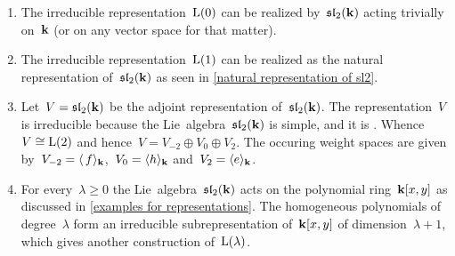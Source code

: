 %       
%       
%       
%       
%       


\begin{examples}
  \leavevmode
  \begin{enumerate}
    \item
      The irreducible representation~$\operatorname{L}(0)$ can be realized by~$\mathfrak{sl}_2(\mathbf{k})$ acting trivially on~$\mathbf{k}$ (or on any {\onedimensional} vector space for that matter).
    \item
      The irreducible representation~$\operatorname{L}(1)$ can be realized as the natural representation of~$\mathfrak{sl}_2(\mathbf{k})$ as seen in \cref{natural representation of sl2}.
    \item
      Let~$V = \mathfrak{sl}_2(\mathbf{k})$ be the adjoint representation of~$\mathfrak{sl}_2(\mathbf{k})$.
      The representation~$V$ is irreducible because the Lie~algebra~$\mathfrak{sl}_2(\mathbf{k})$ is simple, and it is {\threedimensional}.
      Whence~$V \cong \operatorname{L}(2)$ and hence~$V = V_{-2} \oplus V_0 \oplus V_2$.
      The occuring weight spaces are given by~$V_{-2} = \langle\, f\rangle_{\mathbf{k}}$,~$V_0 = \langle h\rangle_{\mathbf{k}}$ and~$V_2 = \langle e\rangle_{\mathbf{k}}$.
    \item
      For every~$\lambda \geq 0$ the Lie~algebra~$\mathfrak{sl}_2(\mathbf{k})$ acts on the polynomial ring~$\mathbf{k}[x,y]$ as discussed in \cref{examples for representations}.
      The homogeneous polynomials of degree~$\lambda$ form an irreducible subrepresentation of~$\mathbf{k}[x,y]$ of dimension~$\lambda + 1$, which gives another construction of~$\operatorname{L}(\lambda)$.
  \end{enumerate}
\end{examples}





